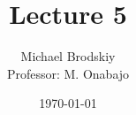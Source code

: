 


\title{Lecture 5}
\date{\today}
\author{Michael Brodskiy\\ \small Professor: M. Onabajo}



\maketitle

